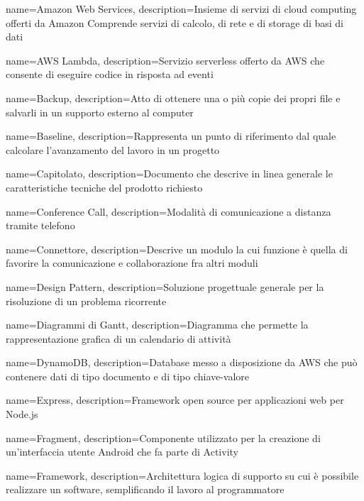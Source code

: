 {
name={Amazon Web Services},
description={Insieme di servizi di cloud computing offerti da Amazon Comprende servizi di calcolo, di rete e di storage di basi di dati}
}

{
	name={AWS Lambda},
	description={Servizio serverless offerto da AWS che consente di eseguire codice in risposta ad eventi}
}

{
name={Backup},
description={Atto di ottenere una o più copie dei propri file e salvarli in un supporto esterno al computer}
}

{
name={Baseline},
description={Rappresenta un punto di riferimento dal quale calcolare l’avanzamento del lavoro in un progetto}
}

{
name={Capitolato},
description={Documento che descrive in linea generale le caratteristiche tecniche del prodotto richiesto}
}

{
name={Conference Call},
description={Modalità di comunicazione a distanza tramite telefono}
}

{
name={Connettore},
description={Descrive un modulo la cui funzione è quella di favorire la comunicazione e collaborazione fra altri moduli}
}

{
name={Design Pattern},
description={Soluzione progettuale generale per la risoluzione di un problema ricorrente}
}

{
name={Diagrammi di Gantt},
description={Diagramma che permette la rappresentazione grafica di un calendario di attività}
}

{
name={DynamoDB},
description={Database messo a disposizione da AWS che può contenere dati di tipo documento e di tipo chiave-valore}
}

{
	name={Express},
	description={Framework open source per applicazioni web per Node.js}
}

{
	name={Fragment},
	description={Componente utilizzato per la creazione di un'interfaccia utente Android che fa parte di Activity}
}

{
name={Framework},
description={Architettura logica di supporto su cui è possibile realizzare un software, semplificando il lavoro al programmatore}
}

